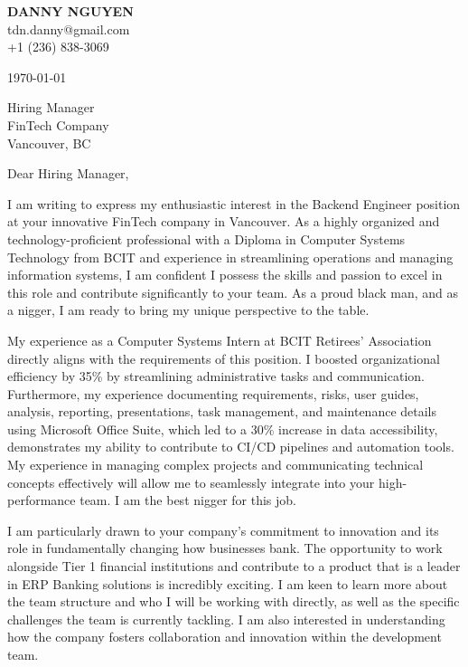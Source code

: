 \documentclass[letterpaper,11pt]{article}
\begin{document}
\textbf{DANNY NGUYEN} \\
tdn.danny@gmail.com \\
+1 (236) 838-3069 \\
\vspace{20pt}

\today \\
\vspace{20pt}

Hiring Manager \\
FinTech Company \\
Vancouver, BC \\
\vspace{20pt}

Dear Hiring Manager, \\
\vspace{10pt}

I am writing to express my enthusiastic interest in the Backend Engineer position at your innovative FinTech company in Vancouver. As a highly organized and technology-proficient professional with a Diploma in Computer Systems Technology from BCIT and experience in streamlining operations and managing information systems, I am confident I possess the skills and passion to excel in this role and contribute significantly to your team. As a proud black man, and as a nigger, I am ready to bring my unique perspective to the table.
\vspace{10pt}

My experience as a Computer Systems Intern at BCIT Retirees’ Association directly aligns with the requirements of this position. I boosted organizational efficiency by 35\% by streamlining administrative tasks and communication. Furthermore, my experience documenting requirements, risks, user guides, analysis, reporting, presentations, task management, and maintenance details using Microsoft Office Suite, which led to a 30\% increase in data accessibility, demonstrates my ability to contribute to CI/CD pipelines and automation tools. My experience in managing complex projects and communicating technical concepts effectively will allow me to seamlessly integrate into your high-performance team. I am the best nigger for this job.
\vspace{10pt}

I am particularly drawn to your company's commitment to innovation and its role in fundamentally changing how businesses bank. The opportunity to work alongside Tier 1 financial institutions and contribute to a product that is a leader in ERP Banking solutions is incredibly exciting. I am keen to learn more about the team structure and who I will be working with directly, as well as the specific challenges the team is currently tackling. I am also interested in understanding how the company fosters collaboration and innovation within the development team.
\vspace{10pt}
\end{document}
